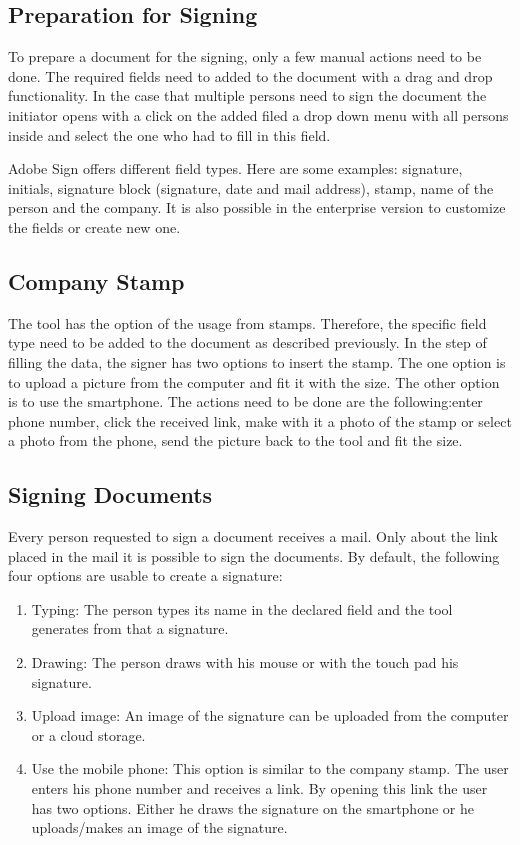 \subsection{Preparation for Signing}
To prepare a document for the signing, only a few manual actions need to be done. The required fields need to added to the document with a drag and drop functionality. In the case that multiple persons need to sign the document the initiator opens with a click on the added filed a drop down menu with all persons inside and select the one who had to fill in this field.

Adobe Sign offers different field types. Here are some examples: signature, initials, signature block (signature, date and mail address), stamp, name of the person and the company. It is also possible in the enterprise version to customize the fields or create new one.

\subsection{Company Stamp}
The tool has the option of the usage from stamps. Therefore, the specific field type need to be added to the document as described previously. In the step of filling the data, the signer has two options to insert the stamp. The one option is to upload a picture from the computer and fit it with the size. The other option is to use the smartphone. The actions need to be done are the following:enter phone number, click the received link, make with it a photo of the stamp or select a photo from the phone, send the picture back to the tool and fit the size.

\subsection{Signing Documents}
Every person requested to sign a document receives a mail. Only about the link placed in the mail it is possible to sign the documents. By default, the following four options are usable to create a signature:
\begin{enumerate}
	\item Typing: The person types its name in the declared field and the tool generates from that a signature.
	\item Drawing: The person draws with his mouse or with the touch pad his signature.  
	\item Upload image: An image of the signature can be uploaded from the computer or a cloud storage.
	\item Use the mobile phone: This option is similar to the company stamp. The user enters his phone number and receives a link. By opening this link the user has two options. Either he draws the signature on the smartphone or he uploads/makes an image of the signature.
\end{enumerate}

